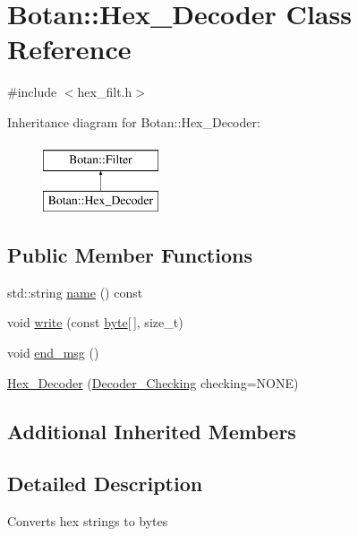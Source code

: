 \hypertarget{classBotan_1_1Hex__Decoder}{\section{Botan\-:\-:Hex\-\_\-\-Decoder Class Reference}
\label{classBotan_1_1Hex__Decoder}
}


{\ttfamily \#include $<$hex\-\_\-filt.\-h$>$}

Inheritance diagram for Botan\-:\-:Hex\-\_\-\-Decoder\-:\begin{figure}[H]
\begin{center}
\leavevmode
\includegraphics[height=2.000000cm]{classBotan_1_1Hex__Decoder}
\end{center}
\end{figure}
\subsection*{Public Member Functions}
\begin{DoxyCompactItemize}
\item 
std\-::string \hyperlink{classBotan_1_1Hex__Decoder_a18c63adf2079bcc86abc0ee5ccb4537f}{name} () const 
\item 
void \hyperlink{classBotan_1_1Hex__Decoder_a4013e02f2bdc32bf978b0e9a7eb21d37}{write} (const \hyperlink{namespaceBotan_a7d793989d801281df48c6b19616b8b84}{byte}\mbox{[}$\,$\mbox{]}, size\-\_\-t)
\item 
void \hyperlink{classBotan_1_1Hex__Decoder_afcc4830fc393b78c50c2041e54bc4b2c}{end\-\_\-msg} ()
\item 
\hyperlink{classBotan_1_1Hex__Decoder_a274b20e88ffab46e134c13002f0303aa}{Hex\-\_\-\-Decoder} (\hyperlink{namespaceBotan_acd5baf937a9984c39f8b44104dde76ae}{Decoder\-\_\-\-Checking} checking=N\-O\-N\-E)
\end{DoxyCompactItemize}
\subsection*{Additional Inherited Members}


\subsection{Detailed Description}
Converts hex strings to bytes 

